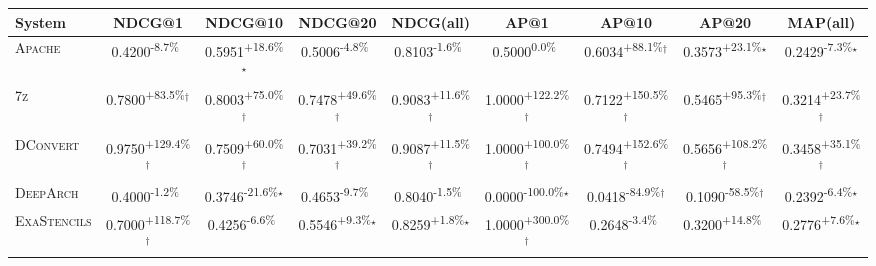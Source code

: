 \begin{table}[htbp]
\centering
\renewcommand{\arraystretch}{1.2}
\begin{tabular}{l|cccc|cccc}
\hline
System & NDCG@1 & NDCG@10 & NDCG@20 & NDCG(all) & AP@1 & AP@10 & AP@20 & MAP(all) \\ \hline
\textsc{Apache} & \cellcolor{red!30}0.4200\textsuperscript{-8.7\%}$^{\,\,\,}$ & \cellcolor{green!30}0.5951\textsuperscript{+18.6\%}$^\star$ & \cellcolor{red!30}0.5006\textsuperscript{-4.8\%}$^{\,\,\,}$ & \cellcolor{red!30}0.8103\textsuperscript{-1.6\%}$^{\,\,\,}$ & \cellcolor{red!30}0.5000\textsuperscript{0.0\%}$^{\,\,\,}$ & \cellcolor{green!30}0.6034\textsuperscript{+88.1\%}$^\dagger$ & \cellcolor{green!30}0.3573\textsuperscript{+23.1\%}$^\star$ & \cellcolor{red!30}0.2429\textsuperscript{-7.3\%}$^\star$ \\
\textsc{7z} & \cellcolor{green!30}0.7800\textsuperscript{+83.5\%}$^\dagger$ & \cellcolor{green!30}0.8003\textsuperscript{+75.0\%}$^\dagger$ & \cellcolor{green!30}0.7478\textsuperscript{+49.6\%}$^\dagger$ & \cellcolor{green!30}0.9083\textsuperscript{+11.6\%}$^\dagger$ & \cellcolor{green!30}1.0000\textsuperscript{+122.2\%}$^\dagger$ & \cellcolor{green!30}0.7122\textsuperscript{+150.5\%}$^\dagger$ & \cellcolor{green!30}0.5465\textsuperscript{+95.3\%}$^\dagger$ & \cellcolor{green!30}0.3214\textsuperscript{+23.7\%}$^\dagger$ \\
\textsc{DConvert} & \cellcolor{green!30}0.9750\textsuperscript{+129.4\%}$^\dagger$ & \cellcolor{green!30}0.7509\textsuperscript{+60.0\%}$^\dagger$ & \cellcolor{green!30}0.7031\textsuperscript{+39.2\%}$^\dagger$ & \cellcolor{green!30}0.9087\textsuperscript{+11.5\%}$^\dagger$ & \cellcolor{green!30}1.0000\textsuperscript{+100.0\%}$^\dagger$ & \cellcolor{green!30}0.7494\textsuperscript{+152.6\%}$^\dagger$ & \cellcolor{green!30}0.5656\textsuperscript{+108.2\%}$^\dagger$ & \cellcolor{green!30}0.3458\textsuperscript{+35.1\%}$^\dagger$ \\
\textsc{DeepArch} & \cellcolor{red!30}0.4000\textsuperscript{-1.2\%}$^{\,\,\,}$ & \cellcolor{red!30}0.3746\textsuperscript{-21.6\%}$^\star$ & \cellcolor{red!30}0.4653\textsuperscript{-9.7\%}$^{\,\,\,}$ & \cellcolor{red!30}0.8040\textsuperscript{-1.5\%}$^{\,\,\,}$ & \cellcolor{red!30}0.0000\textsuperscript{-100.0\%}$^\star$ & \cellcolor{red!30}0.0418\textsuperscript{-84.9\%}$^\dagger$ & \cellcolor{red!30}0.1090\textsuperscript{-58.5\%}$^\dagger$ & \cellcolor{red!30}0.2392\textsuperscript{-6.4\%}$^\star$ \\
\textsc{ExaStencils} & \cellcolor{green!30}0.7000\textsuperscript{+118.7\%}$^\dagger$ & \cellcolor{red!30}0.4256\textsuperscript{-6.6\%}$^{\,\,\,}$ & \cellcolor{green!30}0.5546\textsuperscript{+9.3\%}$^\star$ & \cellcolor{green!30}0.8259\textsuperscript{+1.8\%}$^\star$ & \cellcolor{green!30}1.0000\textsuperscript{+300.0\%}$^\dagger$ & \cellcolor{red!30}0.2648\textsuperscript{-3.4\%}$^{\,\,\,}$ & \cellcolor{green!30}0.3200\textsuperscript{+14.8\%}$^{\,\,\,}$ & \cellcolor{green!30}0.2776\textsuperscript{+7.6\%}$^\star$ \\

\end{tabular}
\end{table}
